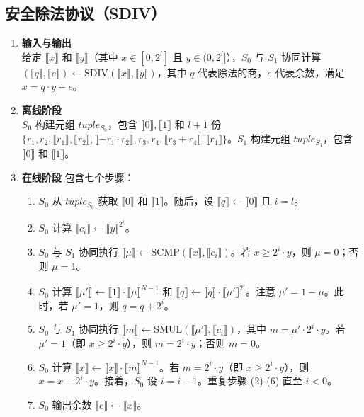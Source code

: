 \subsection{安全除法协议（SDIV）}
\begin{enumerate}[leftmargin=*, nosep]
    \item \textbf{输入与输出}  \\
    给定 $\llbracket x \rrbracket$ 和 $\llbracket y \rrbracket$（其中 $x \in [0, 2^l]$ 且 $y \in (0, 2^l]$），$S_0$ 与 $S_1$ 协同计算 $(\llbracket q \rrbracket, \llbracket e \rrbracket) \leftarrow \text{SDIV}(\llbracket x \rrbracket, \llbracket y \rrbracket)$，其中 $q$ 代表除法的商，$e$ 代表余数，满足 $x = q \cdot y + e$。

    \item \textbf{离线阶段}  \\
    $S_0$ 构建元组 $tuple_{S_0}$，包含 $\llbracket 0 \rrbracket, \llbracket 1 \rrbracket$ 和 $l+1$ 份 $\{ r_1, r_2, \llbracket r_1 \rrbracket, \llbracket r_2 \rrbracket, \llbracket -r_1 \cdot r_2 \rrbracket, r_3, r_4, \llbracket r_3 + r_4 \rrbracket, \llbracket r_4 \rrbracket \}$。$S_1$ 构建元组 $tuple_{S_1}$，包含 $\llbracket 0 \rrbracket$ 和 $\llbracket 1 \rrbracket$。

    \item \textbf{在线阶段}  
    包含七个步骤：
    \begin{enumerate}[leftmargin=*, nosep]
        \item $S_0$ 从 $tuple_{S_0}$ 获取 $\llbracket 0 \rrbracket$ 和 $\llbracket 1 \rrbracket$。随后，设 $\llbracket q \rrbracket \leftarrow \llbracket 0 \rrbracket$ 且 $i = l$。
        \item $S_0$ 计算 $\llbracket c_i \rrbracket \leftarrow \llbracket y \rrbracket^{2^i}$。
        \item $S_0$ 与 $S_1$ 协同执行 $\llbracket \mu \rrbracket \leftarrow \text{SCMP}(\llbracket x \rrbracket, \llbracket c_i \rrbracket)$。若 $x \geq 2^i \cdot y$，则 $\mu = 0$；否则 $\mu = 1$。
        \item $S_0$ 计算 $\llbracket \mu' \rrbracket \leftarrow \llbracket 1 \rrbracket \cdot \llbracket \mu \rrbracket^{N-1}$ 和 $\llbracket q \rrbracket \leftarrow \llbracket q \rrbracket \cdot \llbracket \mu' \rrbracket^{2^i}$。注意 $\mu' = 1 - \mu$。此时，若 $\mu' = 1$，则 $q = q + 2^i$。
        \item $S_0$ 与 $S_1$ 协同执行 $\llbracket m \rrbracket \leftarrow \text{SMUL}(\llbracket \mu' \rrbracket, \llbracket c_i \rrbracket)$，其中 $m = \mu' \cdot 2^i \cdot y$。若 $\mu' = 1$（即 $x \geq 2^i \cdot y$），则 $m = 2^i \cdot y$；否则 $m = 0$。
        \item $S_0$ 计算 $\llbracket x \rrbracket \leftarrow \llbracket x \rrbracket \cdot \llbracket m \rrbracket^{N-1}$。若 $m = 2^i \cdot y$（即 $x \geq 2^i \cdot y$），则 $x = x - 2^i \cdot y$。接着，$S_0$ 设 $i = i - 1$。重复步骤 (2)-(6) 直至 $i < 0$。
        \item $S_0$ 输出余数 $\llbracket e \rrbracket \leftarrow \llbracket x \rrbracket$。
    \end{enumerate}
\end{enumerate}


